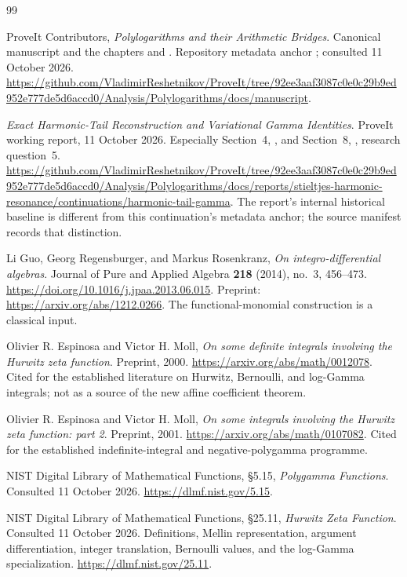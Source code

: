 \begin{thebibliography}{99}
\raggedright
{}
ProveIt Contributors, \emph{Polylogarithms and their Arithmetic Bridges}.
Canonical manuscript and the chapters
 and
.
Repository metadata anchor \texttt{\pin}; consulted 11 October 2026.
\url{https://github.com/VladimirReshetnikov/ProveIt/tree/92ee3aaf3087c0e0c29b9ed952e777de5d6accd0/Analysis/Polylogarithms/docs/manuscript}.

\emph{Exact Harmonic-Tail Reconstruction and Variational Gamma
Identities}. ProveIt working report, 11 October 2026.
Especially Section~4, , and
Section~8, , research question~5.
\url{https://github.com/VladimirReshetnikov/ProveIt/tree/92ee3aaf3087c0e0c29b9ed952e777de5d6accd0/Analysis/Polylogarithms/docs/reports/stieltjes-harmonic-resonance/continuations/harmonic-tail-gamma}.
The report's internal historical baseline is different from this
continuation's metadata anchor; the source manifest records that distinction.

Li Guo, Georg Regensburger, and Markus Rosenkranz,
\emph{On integro-differential algebras}.
Journal of Pure and Applied Algebra \textbf{218} (2014), no.~3,
456--473. \url{https://doi.org/10.1016/j.jpaa.2013.06.015}.
Preprint: \url{https://arxiv.org/abs/1212.0266}.
The functional-monomial construction is a classical input.

Olivier R. Espinosa and Victor H. Moll,
\emph{On some definite integrals involving the Hurwitz zeta function}.
Preprint, 2000. \url{https://arxiv.org/abs/math/0012078}.
Cited for the established literature on Hurwitz, Bernoulli, and
log-Gamma integrals; not as a source of the new affine coefficient theorem.

Olivier R. Espinosa and Victor H. Moll,
\emph{On some integrals involving the Hurwitz zeta function: part 2}.
Preprint, 2001. \url{https://arxiv.org/abs/math/0107082}.
Cited for the established indefinite-integral and negative-polygamma
programme.

NIST Digital Library of Mathematical Functions, \S5.15,
\emph{Polygamma Functions}. Consulted 11 October 2026.
\url{https://dlmf.nist.gov/5.15}.

NIST Digital Library of Mathematical Functions, \S25.11,
\emph{Hurwitz Zeta Function}. Consulted 11 October 2026.
Definitions, Mellin representation, argument differentiation,
integer translation, Bernoulli values, and the log-Gamma specialization.
\url{https://dlmf.nist.gov/25.11}.


\end{thebibliography}
